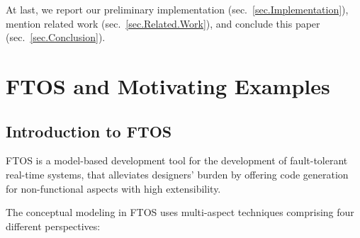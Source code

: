 \documentclass[10pt, a4paper, onecolumn, conference, compsocconf]{IEEEtran}
\begin{document}
At last, we report our preliminary implementation (sec.~\ref{sec.Implementation}), mention related work (sec.~\ref{sec.Related.Work}), and conclude this paper (sec.~\ref{sec.Conclusion}).

\section{FTOS and Motivating Examples\label{sec.Motivating.Examples}}

\subsection{Introduction to FTOS}
FTOS is a model-based development tool for the development of fault-tolerant real-time systems, that alleviates designers' burden by offering code generation for non-functional aspects with high extensibility.

The conceptual modeling in FTOS uses multi-aspect techniques comprising four different perspectives:
\end{document}
